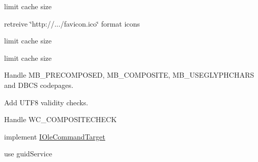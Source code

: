 \begin{DoxyRefList}
limit cache size  
\item[\label{todo__todo000020}%
\Hypertarget{todo__todo000020}%
成员 \hyperlink{struct_icon_cache_a62b18f8a6dc71ed7632c22879728f472}{Icon\+Cache\+:\+:extract} (L\+P\+C\+T\+S\+TR path, int icon\+\_\+idx, I\+C\+O\+N\+C\+A\+C\+H\+E\+\_\+\+F\+L\+A\+GS flags=I\+C\+F\+\_\+\+H\+I\+C\+ON)]retreive \char`\"{}http\+://.../favicon.\+ico\char`\"{} format icons  
\item[\label{todo__todo000021}%
\Hypertarget{todo__todo000021}%
成员 \hyperlink{struct_icon_cache_a0f47a9cd0630185ccef96fddcdb40083}{Icon\+Cache\+:\+:extract} (L\+P\+C\+I\+T\+E\+M\+I\+D\+L\+I\+ST pidl, I\+C\+O\+N\+C\+A\+C\+H\+E\+\_\+\+F\+L\+A\+GS flags=I\+C\+F\+\_\+\+N\+O\+R\+M\+AL)]limit cache size 

limit cache size  
\item[\label{todo__todo000008}%
\Hypertarget{todo__todo000008}%
组 \hyperlink{dll_2win32_2kernel32_2winnls_2string_2nls_8c_amgrpa1398c84f77a633d304bc100a09dae22}{Int\+Multi\+Byte\+To\+Wide\+Char\+CP} ]Handle M\+B\+\_\+\+P\+R\+E\+C\+O\+M\+P\+O\+S\+ED, M\+B\+\_\+\+C\+O\+M\+P\+O\+S\+I\+TE, M\+B\+\_\+\+U\+S\+E\+G\+L\+Y\+P\+H\+C\+H\+A\+RS and D\+B\+CS codepages.  
\item[\label{todo__todo000007}%
\Hypertarget{todo__todo000007}%
组 \hyperlink{dll_2win32_2kernel32_2winnls_2string_2nls_8c_amgrp771db854a48b19ccbf5af379134eec2d}{Int\+Multi\+Byte\+To\+Wide\+Char\+U\+T\+F8} ]Add U\+T\+F8 validity checks.  
\item[\label{todo__todo000009}%
\Hypertarget{todo__todo000009}%
组 \hyperlink{dll_2win32_2kernel32_2winnls_2string_2nls_8c_amgrp19b808c697bd155e4554cc5f0a59a76e}{Int\+Wide\+Char\+To\+Multi\+Byte\+CP} ]Handle W\+C\+\_\+\+C\+O\+M\+P\+O\+S\+I\+T\+E\+C\+H\+E\+CK  
\item[\label{todo__todo000081}%
\Hypertarget{todo__todo000081}%
成员 \hyperlink{struct_i_shell_browser_impl_a031b9143340e0e0652e6985b8f0f5b75}{I\+Shell\+Browser\+Impl\+:\+:Exec} (const \hyperlink{interface_g_u_i_d}{G\+U\+ID} $\ast$pguid\+Cmd\+Group, D\+W\+O\+RD n\+Cmd\+ID, D\+W\+O\+RD n\+Cmdexecopt, V\+A\+R\+I\+A\+NT $\ast$pva\+In, V\+A\+R\+I\+A\+NT $\ast$pva\+Out)]implement \hyperlink{interface_i_ole_command_target}{I\+Ole\+Command\+Target}  
\item[\label{todo__todo000079}%
\Hypertarget{todo__todo000079}%
成员 \hyperlink{struct_i_shell_browser_impl_ab25e872ce1179ccc7dd65a09820a2b6f}{I\+Shell\+Browser\+Impl\+:\+:Query\+Service} (R\+E\+F\+G\+U\+ID guid\+Service, R\+E\+F\+I\+ID riid, void $\ast$$\ast$ppv\+Object)]use guid\+Service  
$$
\end{DoxyRefList}
